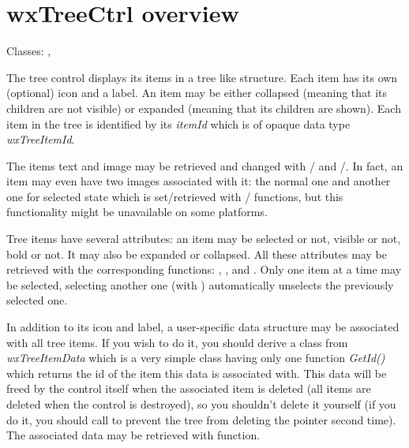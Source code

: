 \section{wxTreeCtrl overview}\label{wxtreectrloverview}

Classes: , 

The tree control displays its items in a tree like structure. Each item has its
own (optional) icon and a label. An item may be either collapsed (meaning that
its children are not visible) or expanded (meaning that its children are
shown). Each item in the tree is identified by its {\it itemId} which is of
opaque data type {\it wxTreeItemId}.

The items text and image may be retrieved and changed with 
/ 
and 
/.
In fact, an item may even have two images associated with it: the normal one
and another one for selected state which is set/retrieved with 
/ 
functions, but this functionality might be unavailable on some platforms.

Tree items have several attributes: an item may be selected or not, visible or
not, bold or not. It may also be expanded or collapsed. All these attributes
may be retrieved with the corresponding functions: 
, 
,  
and . Only one item at a time may be
selected, selecting another one (with 
) automatically unselects the
previously selected one.

In addition to its icon and label, a user-specific data structure may be associated
with all tree items. If you wish to do it, you should derive a class from {\it
wxTreeItemData} which is a very simple class having only one function {\it
GetId()} which returns the id of the item this data is associated with. This
data will be freed by the control itself when the associated item is deleted
(all items are deleted when the control is destroyed), so you shouldn't delete
it yourself (if you do it, you should call 
 to prevent the tree from
deleting the pointer second time). The associated data may be retrieved with 
 function.


